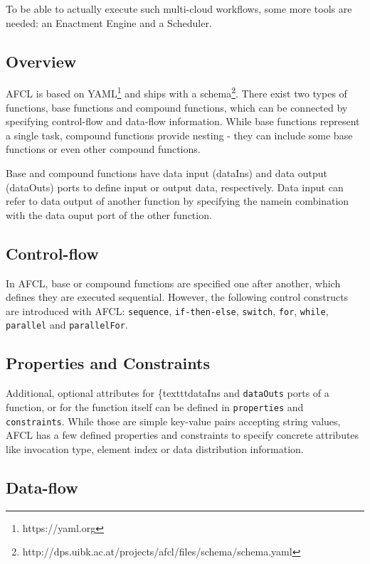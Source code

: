\documentclass[a4paper,12pt,pdftex,halfparskip,cleardoubleempty,bibtotoc,liststotoc]{scrbook}
\begin{document}
To be able to actually execute such multi-cloud workflows, some more tools are needed: an Enactment Engine and a Scheduler.

\subsection{Overview}
AFCL is based on YAML\footnote{https://yaml.org} and ships with a schema\footnote{http://dps.uibk.ac.at/projects/afcl/files/schema/schema.yaml}. There exist two types of functions, base functions and compound functions, which can be connected by specifying control-flow and data-flow information. While base functions represent a single task, compound functions provide nesting - they can include some base functions or even other compound functions.

Base and compound functions have data input (dataIns) and data output (dataOuts) ports to define input or output data, respectively.
Data input can refer to data output of another function by specifying the namein combination with the data ouput port of the other function.

\subsection{Control-flow}
In AFCL, base or compound functions are specified one after another, which defines they are executed sequential. However, the following control constructs are introduced with AFCL: \texttt{sequence}, \texttt{if-then-else}, \texttt{switch}, \texttt{for}, \texttt{while}, \texttt{parallel} and \texttt{parallelFor}.


\subsection{Properties and Constraints}

Additional, optional attributes for \{texttt{dataIns} and \texttt{dataOuts} ports of a function, or for the function itself can be defined in \texttt{properties} and \texttt{constraints}. While those are simple key-value pairs accepting string values, AFCL has a few defined properties and constraints to specify concrete attributes like invocation type, element index or data distribution information.

\subsection{Data-flow}
\end{document}

